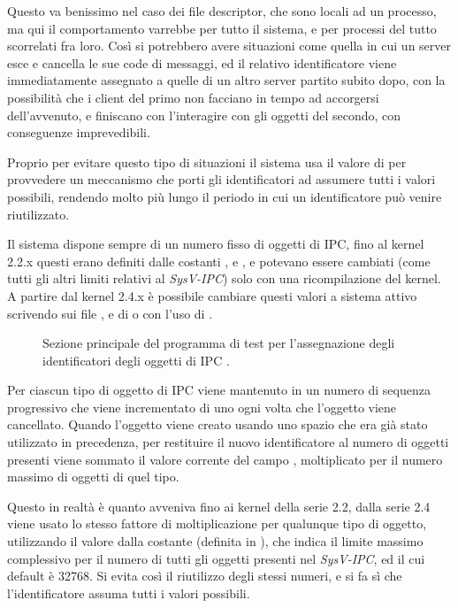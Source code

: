 Questo va benissimo nel caso dei file descriptor, che sono locali ad un
processo, ma qui il comportamento varrebbe per tutto il sistema, e per
processi del tutto scorrelati fra loro. Così si potrebbero avere situazioni
come quella in cui un server esce e cancella le sue code di messaggi, ed il
relativo identificatore viene immediatamente assegnato a quelle di un altro
server partito subito dopo, con la possibilità che i client del primo non
facciano in tempo ad accorgersi dell'avvenuto, e finiscano con l'interagire
con gli oggetti del secondo, con conseguenze imprevedibili.

Proprio per evitare questo tipo di situazioni il sistema usa il valore di
 per provvedere un meccanismo che porti gli identificatori ad
assumere tutti i valori possibili, rendendo molto più lungo il periodo in cui
un identificatore può venire riutilizzato.

Il sistema dispone sempre di un numero fisso di oggetti di IPC, fino al kernel
2.2.x questi erano definiti dalle costanti ,  e
, e potevano essere cambiati (come tutti gli altri limiti
relativi al \textit{SysV-IPC}) solo con una ricompilazione del kernel.  A
partire dal kernel 2.4.x è possibile cambiare questi valori a sistema attivo
scrivendo sui file ,
 e  di
 o con l'uso di .

\begin{figure}[!htb]
  \footnotesize \centering
  \begin{minipage}[c]{\codesamplewidth}
  \end{minipage} 
  \normalsize 
  \caption{Sezione principale del programma di test per l'assegnazione degli
    identificatori degli oggetti di IPC .}
  \label{fig:ipc_sysv_idtest}
\end{figure}

Per ciascun tipo di oggetto di IPC viene mantenuto in  un numero di
sequenza progressivo che viene incrementato di uno ogni volta che l'oggetto
viene cancellato. Quando l'oggetto viene creato usando uno spazio che era già
stato utilizzato in precedenza, per restituire il nuovo identificatore al
numero di oggetti presenti viene sommato il valore corrente del campo
, moltiplicato per il numero massimo di oggetti di quel tipo.

Questo in realtà è quanto avveniva fino ai kernel della serie 2.2, dalla serie
2.4 viene usato lo stesso fattore di moltiplicazione per qualunque tipo di
oggetto, utilizzando il valore dalla costante  (definita in
), che indica il limite massimo complessivo per il
numero di tutti gli oggetti presenti nel \textit{SysV-IPC}, ed il cui default
è 32768.  Si evita così il riutilizzo degli stessi numeri, e si fa sì che
l'identificatore assuma tutti i valori possibili.

